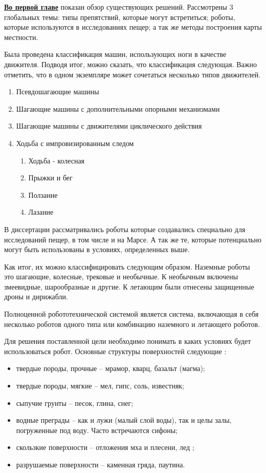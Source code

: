 
\textbf{\underline{Во первой главе}} показан обзор существующих решений. Рассмотрены 3 глобальных темы: типы препятствий, которые могут встретиться; роботы, которые используются в исследованиях пещер; а так же методы построения карты местности.

Была проведена классификация машин, использующих ноги в качестве движителя. Подводя итог, можно сказать, что классификация следующая. Важно отметить, что в одном экземпляре может сочетаться несколько типов движителей.
\begin{enumerate}
    \item Псевдошагающие машины
    \item Шагающие машины с дополнительными опорными механизмами
    \item Шагающие машины с движителями циклического действия
    \item Ходьба с импровизированным следом
    \begin{enumerate}
    \item Ходьба - колесная
    \item Прыжки и бег
    \item Ползание
    \item Лазание
    \end{enumerate}
    \end{enumerate}
    
В диссертации рассматривались роботы которые создавались специально для исследований пещер, в том числе и на Марсе. А так же те, которые потенциально могут быть использованы в условиях, определенных выше.

Как итог, их можно классифицировать следующим образом. Наземные роботы это шагающие, колесные, трековые и необычные. К необычным включены змеевидные, шарообразные и другие. К летающим были отнесены защищенные дроны и дирижабли.

Полноценной робототехнической системой является система, включающая в себя несколько роботов одного типа или комбинацию наземного и летающего роботов.

Для решения поставленной цели необходимо понимать в каких условиях будет использоваться робот. Основные структуры поверхностей следующие :
\begin{itemize}
    \item твердые породы, прочные -- мрамор, кварц, базальт (магма);
    \item твердые породы, мягкие -- мел, гипс, соль, известняк;
    \item сыпучие грунты -- песок, глина, снег;
    \item водные преграды -- как и лужи (малый слой воды), так и целы залы, погруженные под воду. Часто встречаются сифоны;
    \item скользкие поверхности -- отложения мха и плесени, лед ;
    \item разрушаемые поверхности -- каменная гряда, паутина.
\end{itemize}



